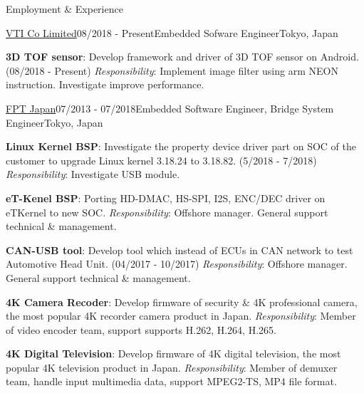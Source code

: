 \documentclass{resume}
\begin{document}
  \begin{rSection}{Employment \& Experience}
  
    \begin{rSubsection}{\underline{VTI Co Limited}}{08/2018 - Present}{Embedded Sofware Engineer}{Tokyo, Japan}
    \item \textbf{3D TOF sensor}: Develop framework and driver of 3D TOF sensor on Android. (08/2018 - Present)
    \newline \textit{Responsibility}: Implement image filter using arm NEON instruction. Investigate improve performance.
    \end{rSubsection}
  
    \begin{rSubsection}{\underline{FPT Japan}}{07/2013 - 07/2018}{Embedded Software Engineer, Bridge System Engineer}{Tokyo, Japan}
    \item \textbf{Linux Kernel BSP}: Investigate the property device driver part on SOC of the customer to upgrade Linux kernel 3.18.24 to 3.18.82. (5/2018 - 7/2018)
    \newline \textit{Responsibility}: Investigate USB module.

    \item \textbf{eT-Kenel BSP}: Porting HD-DMAC, HS-SPI, I2S, ENC/DEC driver on eTKernel to new SOC.
    \newline \textit{Responsibility}: Offshore manager. General support technical \& management.

    \item \textbf{CAN-USB tool}: Develop tool which instead of ECUs in CAN network to test Automotive Head Unit. (04/2017 - 10/2017) 
    \newline \textit{Responsibility}: Offshore manager. General support technical \& management.

    \item \textbf{4K Camera Recoder}: Develop firmware of security \& 4K professional camera, the most popular 4K recorder camera product in Japan.
    \newline \textit{Responsibility}: Member of video encoder team, support supports H.262, H.264, H.265.

    \item \textbf{4K Digital Television}: Develop firmware of 4K digital television, the most popular 4K television product in Japan.
    \newline \textit{Responsibility}: Member of demuxer team, handle input multimedia data, support MPEG2-TS, MP4 file format.


\end{rSubsection}
\end{rSection}
\end{document}
